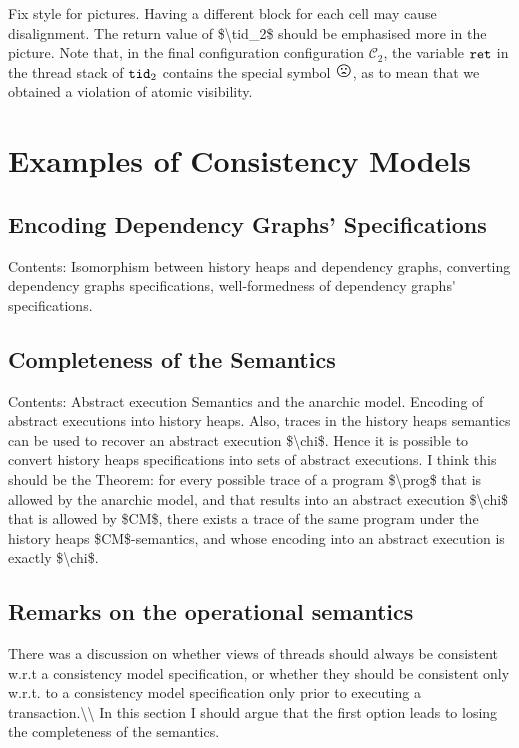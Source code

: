\documentclass[a4paper,UKenglish]{article}%
\theoremstyle{plain}
\begin{document}
\begin{center}
\end{center}

\ac{Fix style for pictures. Having a different block for each cell may cause disalignment.
The return value of $\tid_2$ should be emphasised more in the picture.}
Note that, in the final configuration configuration $\mathcal{C}_2$, the variable $\texttt{ret}$ in the thread 
stack of $\tid_2$ contains the special symbol $\Large \frownie{}$, as to mean that we obtained a violation of 
atomic visibility.

\section{Examples of Consistency Models}



\subsection{Encoding Dependency Graphs' Specifications}
\ac{Contents: Isomorphism between history heaps and dependency graphs, 
converting dependency graphs specifications, well-formedness of dependency graphs' specifications.}

\subsection{Completeness of the Semantics} 
\ac{Contents: Abstract execution Semantics and the anarchic model. 
Encoding of abstract executions into history heaps. Also, 
traces in the history heaps semantics can be used to recover 
an abstract execution $\chi$. Hence it is possible to convert history heaps 
specifications into sets of abstract executions.
I think this should be the Theorem: for every possible trace of a program $\prog$ that is allowed by the anarchic 
model, and that results into an abstract execution $\chi$ that is allowed by $CM$, there 
exists a trace of the same program under the history heaps $CM$-semantics, 
and whose encoding into an abstract execution is exactly $\chi$.}
\subsection{Remarks on the operational semantics}
\ac{There was a discussion on whether views of threads should always be consistent w.r.t a 
consistency model specification, or whether they should be consistent only w.r.t. to 
a consistency model specification only prior to executing a transaction.\\ 
In this section I should argue that the first option leads to losing the completeness of the 
semantics.}
\end{document}
